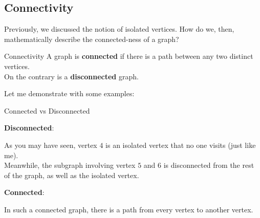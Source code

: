 \subsection{Connectivity}
Previously, we discussed the notion of isolated vertices. How do we, then, mathematically describe the connected-ness of a graph?
\begin{ln-define}{Connectivity}{}
    A graph is \textbf{connected} if there is a path between any two distinct vertices. \\
    On the contrary is a \textbf{disconnected} graph.
\end{ln-define}
Let me demonstrate with some examples:
\begin{ln-fig}[sidebyside]{Connected vs Disconnected}{}
    \begin{center}
        \textbf{Disconnected}: \\

        \vspace{0.2cm}
    \end{center}
    As you may have seen, vertex $4$ is an isolated vertex that no one visits (just like me). \\
    Meanwhile, the subgraph involving vertex $5$ and $6$ is disconnected from the rest of the graph, as well as the isolated vertex. 
    \tcblower
    \begin{center}
        \textbf{Connected}:
        
        \vspace{0.2cm}
    \end{center}
    In such a connected graph, there is a path from every vertex to another vertex.
    \\
    \\
    \\
\end{ln-fig}

